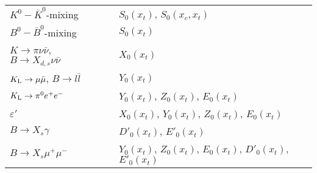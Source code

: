 \documentclass[12pt]{article}
\begin{document}
\begin{itemize}
\begin{center}
\begin{tabular}{lcl}
$K^0-\bar K^0$-mixing &\qquad\qquad& $S_0(x_t)$, $S_0(x_c,x_t)$ \\
$B^0-\bar B^0$-mixing &\qquad\qquad& $S_0(x_t)$ \\
$K \to \pi \nu \bar\nu$, $B \to X_{d,s} \nu \bar\nu$ 
&\qquad\qquad& $X_0(x_t)$ \\
$K_{\rm L}\to \mu \bar\mu$, $B \to l\bar l$ &\qquad\qquad& $Y_0(x_t)$ \\
$K_{\rm L} \to \pi^0 e^+ e^-$ &\qquad\qquad& $Y_0(x_t)$, $Z_0(x_t)$, 
$E_0(x_t)$ \\
$\varepsilon'$ &\qquad\qquad& $X_0(x_t)$, $Y_0(x_t)$, $Z_0(x_t)$,
$E_0(x_t)$ \\
$B \to X_s \gamma$ &\qquad\qquad& $D'_0(x_t)$, $E'_0(x_t)$ \\
$B \to X_s \mu^+ \mu^-$ &\qquad\qquad&
$Y_0(x_t)$, $Z_0(x_t)$, $E_0(x_t)$, $D'_0(x_t)$, $E'_0(x_t)$
\end{tabular}
\end{center}


\end{itemize}
\end{document}
